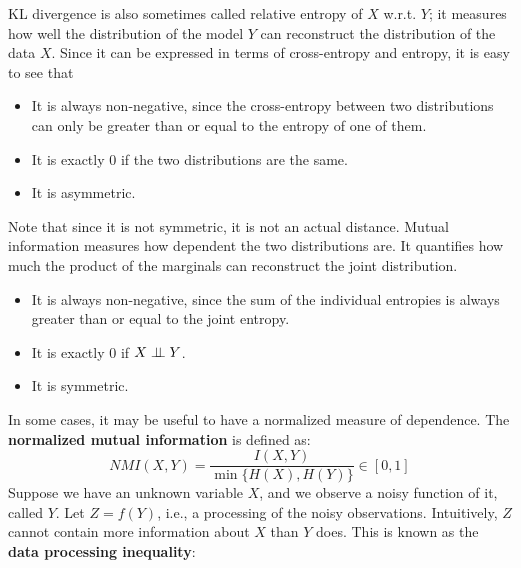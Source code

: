 KL divergence is also sometimes called relative entropy of $X$ w.r.t. $Y$; it measures how well the distribution of the model $Y$ can reconstruct the distribution of the data $X$. Since it can be expressed in terms of cross-entropy and entropy, it is easy to see that
\begin{itemize}[itemsep=0pt]
    \item It is always non-negative, since the cross-entropy between two distributions can only be greater than or equal to the entropy of one of them.
    \item It is exactly 0 if the two distributions are the same.
    \item It is asymmetric.
\end{itemize}
Note that since it is not symmetric, it is not an actual distance.
Mutual information measures how dependent the two distributions are. It quantifies how much the product of the marginals can reconstruct the joint distribution.
\begin{itemize}[itemsep=0pt]
    \item It is always non-negative, since the sum of the individual entropies is always greater than or equal to the joint entropy.
    \item It is exactly 0 if $X \perp \!\!\! \perp Y$.
    \item It is symmetric.
\end{itemize}
In some cases, it may be useful to have a normalized measure of dependence. The \textbf{normalized mutual information} is defined as:
\begin{equation*}
    NMI(X,Y) = \frac{I(X,Y)}{\min\{H(X), H(Y)\}} \in [0,1]
\end{equation*}
Suppose we have an unknown variable $X$, and we observe a noisy function of it, called $Y$. Let $Z = f(Y)$, i.e., a processing of the noisy observations. Intuitively, $Z$ cannot contain more information about $X$ than $Y$ does. This is known as the \textbf{data processing inequality}:
